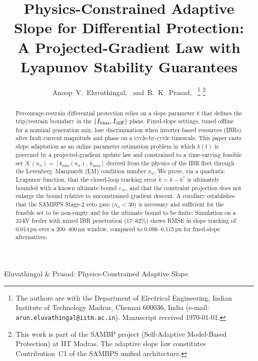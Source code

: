 \documentclass[journal]{IEEEtran}
\newcommand{\kappan}{\kappa_{n}}
\newcommand{\ktilde}{\tilde{k}}
\newcommand{\kstar}{k^*}
\newcommand{\kmin}{k_{\min}}
\newcommand{\kmax}{k_{\max}}
\newcommand{\Idiff}{I_{\rm diff}}
\newcommand{\Ibias}{I_{\rm bias}}
\newcommand{\calK}{\mathcal{K}}
\begin{document}
\title{Physics-Constrained Adaptive Slope for Differential Protection:\\
       A Projected-Gradient Law with Lyapunov Stability Guarantees}

\author{Anoop~V.~Eluvathingal,~
        and~R.~K.~Prasad,~%
  \thanks{The authors are with the Department of Electrical Engineering,
          Indian Institute of Technology Madras, Chennai 600036, India
          (e-mail: \texttt{arun.eluvathingal@iitm.ac.in}).
          Manuscript received \today.}%
  \thanks{This work is part of the SAMBP project
          (Self-Adaptive Model-Based Protection) at IIT Madras.
          The adaptive slope law constitutes Contribution~C1 of
          the SAMBPS unified architecture.}}

%
{Eluvathingal \& Prasad: Physics-Constrained Adaptive Slope}

\maketitle

\begin{abstract}
Percentage-restrain differential protection relies on a slope parameter
$k$ that defines the trip/restrain boundary in the
$(\Ibias,\Idiff)$ plane.  Fixed-slope settings, tuned offline for a
nominal generation mix, lose discrimination when inverter-based resources
(IBRs) alter fault-current magnitude and phase on a cycle-by-cycle
timescale.  This paper casts slope adaptation as an online parameter
estimation problem in which $k(t)$ is governed by a projected-gradient
update law and constrained to a time-varying feasible set
$\calK(\kappan) = [\kmin(\kappan),\,\kmax]$ derived from
the physics of the IBR fleet through the Levenberg--Marquardt (LM)
condition number $\kappan$.
We prove, via a quadratic Lyapunov function, that the closed-loop
tracking error $\ktilde = k - \kstar$ is ultimately bounded with
a known ultimate bound $\varepsilon_\infty$, and that the constraint
projection does not enlarge the bound relative to unconstrained gradient
descent.  A corollary establishes that the SAMBPS Stage-2 veto gate
($\kappan < 30$) is necessary and sufficient for the feasible set to be
non-empty and for the ultimate bound to be finite.
Simulation on a 33\,kV feeder with mixed IBR penetration (17--62\%)
shows RMSE in slope tracking of 0.014\,pu over a 200--400\,ms window,
compared to 0.096--0.115\,pu for fixed-slope alternatives.
\end{abstract}
\end{document}
